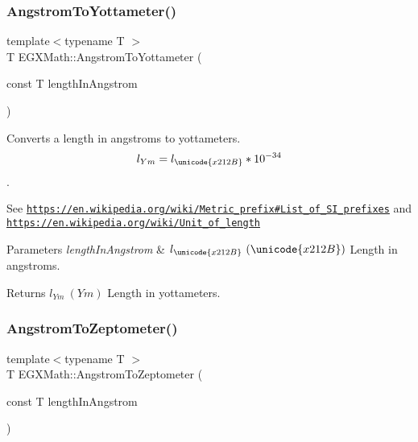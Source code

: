 \subsubsection{\texorpdfstring{Angstrom\+To\+Yottameter()}{AngstromToYottameter()}}
{\footnotesize\ttfamily template$<$typename T $>$ \\
T E\+G\+X\+Math\+::\+Angstrom\+To\+Yottameter (\begin{DoxyParamCaption}\item[{const T}]{length\+In\+Angstrom }\end{DoxyParamCaption})}



Converts a length in angstroms to yottameters. \[ l_{Ym}=l_{\unicode{x212B}} * 10^{-34} \]. 

See \href{https://en.wikipedia.org/wiki/Metric_prefix#List_of_SI_prefixes}{\tt https\+://en.\+wikipedia.\+org/wiki/\+Metric\+\_\+prefix\#\+List\+\_\+of\+\_\+\+S\+I\+\_\+prefixes} and \href{https://en.wikipedia.org/wiki/Unit_of_length}{\tt https\+://en.\+wikipedia.\+org/wiki/\+Unit\+\_\+of\+\_\+length} 
\begin{DoxyParams}{Parameters}
{\em length\+In\+Angstrom} & $ l_{\unicode{x212B}}\ (\unicode{x212B})$ Length in angstroms. \\
\hline
\end{DoxyParams}
\begin{DoxyReturn}{Returns}
$ l_{Ym}\ (Ym)$ Length in yottameters. 
\end{DoxyReturn}
\mbox{\label{group___e_g_x_math-_conversions-_length_conversions-_non-_s_i-_angstrom-_s_i_ga2516c0f4dedd31c3803c05f4add3fa13}} 
\subsubsection{\texorpdfstring{Angstrom\+To\+Zeptometer()}{AngstromToZeptometer()}}
{\footnotesize\ttfamily template$<$typename T $>$ \\
T E\+G\+X\+Math\+::\+Angstrom\+To\+Zeptometer (\begin{DoxyParamCaption}\item[{const T}]{length\+In\+Angstrom }\end{DoxyParamCaption})}



